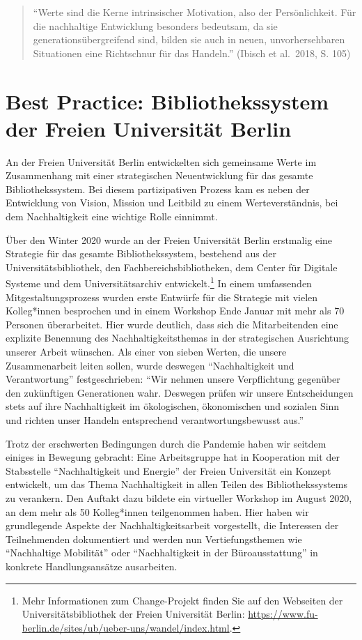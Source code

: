 \documentclass[a4paper,
fontsize=11pt,
oneside,
numbers=noperiodatend,
parskip=half-,
bibliography=totoc,
final
]{scrartcl}
\begin{document}
\begin{quote}
\enquote{Werte sind die Kerne intrinsischer Motivation, also der
Persönlichkeit. Für die nachhaltige Entwicklung besonders bedeutsam, da
sie generationsübergreifend sind, bilden sie auch in neuen,
unvorhersehbaren Situationen eine Richtschnur für das Handeln.} (Ibisch
et al.~2018, S. 105)
\end{quote}

\hypertarget{best-practice-bibliothekssystem-der-freien-universituxe4t-berlin}{%
\section{Best Practice: Bibliothekssystem der Freien Universität
Berlin}\label{best-practice-bibliothekssystem-der-freien-universituxe4t-berlin}}

An der Freien Universität Berlin entwickelten sich gemeinsame Werte im
Zusammenhang mit einer strategischen Neuentwicklung für das gesamte
Bibliothekssystem. Bei diesem partizipativen Prozess kam es neben der
Entwicklung von Vision, Mission und Leitbild zu einem Werteverständnis,
bei dem Nachhaltigkeit eine wichtige Rolle einnimmt.

Über den Winter 2020 wurde an der Freien Universität Berlin erstmalig
eine Strategie für das gesamte Bibliothekssystem, bestehend aus der
Universitätsbibliothek, den Fachbereichsbibliotheken, dem Center für
Digitale Systeme und dem Universitätsarchiv entwickelt.\footnote{Mehr
  Informationen zum Change-Projekt finden Sie auf den Webseiten der
  Universitätsbibliothek der Freien Universität Berlin:
  \url{https://www.fu-berlin.de/sites/ub/ueber-uns/wandel/index.html}.}
In einem umfassenden Mitgestaltungsprozess wurden erste Entwürfe für die
Strategie mit vielen Kolleg*innen besprochen und in einem Workshop Ende
Januar mit mehr als 70 Personen überarbeitet. Hier wurde deutlich, dass
sich die Mitarbeitenden eine explizite Benennung des
Nachhaltigkeitsthemas in der strategischen Ausrichtung unserer Arbeit
wünschen. Als einer von sieben Werten, die unsere Zusammenarbeit leiten
sollen, wurde deswegen \enquote{Nachhaltigkeit und Verantwortung}
festgeschrieben: \enquote{Wir nehmen unsere Verpflichtung gegenüber den
zukünftigen Generationen wahr. Deswegen prüfen wir unsere Entscheidungen
stets auf ihre Nachhaltigkeit im ökologischen, ökonomischen und sozialen
Sinn und richten unser Handeln entsprechend verantwortungsbewusst aus.}

Trotz der erschwerten Bedingungen durch die Pandemie haben wir seitdem
einiges in Bewegung gebracht: Eine Arbeitsgruppe hat in Kooperation mit
der Stabsstelle \enquote{Nachhaltigkeit und Energie} der Freien
Universität ein Konzept entwickelt, um das Thema Nachhaltigkeit in allen
Teilen des Bibliothekssystems zu verankern. Den Auftakt dazu bildete ein
virtueller Workshop im August 2020, an dem mehr als 50 Kolleg*innen
teilgenommen haben. Hier haben wir grundlegende Aspekte der
Nachhaltigkeitsarbeit vorgestellt, die Interessen der Teilnehmenden
dokumentiert und werden nun Vertiefungsthemen wie \enquote{Nachhaltige
Mobilität} oder \enquote{Nachhaltigkeit in der Büroausstattung} in
konkrete Handlungsansätze ausarbeiten.
\end{document}
